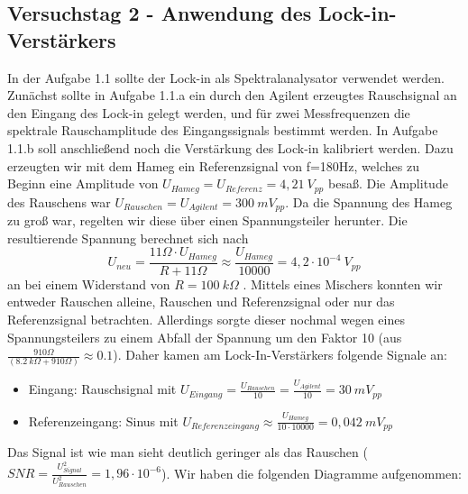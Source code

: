 \documentclass{scrartcl}						%
\begin{document}
		\subsection{Versuchstag 2 - Anwendung des Lock-in-Verstärkers}
			In der Aufgabe 1.1 sollte der Lock-in als Spektralanalysator verwendet werden.
			Zunächst sollte in Aufgabe 1.1.a ein durch den Agilent erzeugtes Rauschsignal an den Eingang des Lock-in gelegt werden, und für zwei Messfrequenzen die spektrale Rauschamplitude des Eingangssignals bestimmt werden. In Aufgabe 1.1.b soll anschließend noch die Verstärkung des Lock-in kalibriert werden. Dazu erzeugten wir mit dem Hameg ein Referenzsignal von f=180Hz, welches zu Beginn eine Amplitude von $ U_{Hameg}=U_{Referenz}=4,21 \ V_{pp} $ besaß. Die Amplitude des Rauschens war $ U_{Rauschen}=U_{Agilent}=300 \ mV_{pp} $. Da die Spannung des Hameg zu groß war, regelten wir diese über einen Spannungsteiler herunter. Die resultierende Spannung berechnet sich nach 
			\begin{equation*}
					U_{neu}=\frac{11\Omega \cdot U_{Hameg}}{R+11\Omega} \approx \frac{U_{Hameg}}{10000} =4,2\cdot 10^{-4} \ V_{pp} 
			\end{equation*}
			an bei einem Widerstand von $ R=100 \ k\Omega$ .
			Mittels eines Mischers konnten wir entweder Rauschen alleine, Rauschen und Referenzsignal oder nur das Referenzsignal betrachten. Allerdings sorgte dieser nochmal wegen eines Spannungsteilers zu einem Abfall der Spannung um den Faktor 10 (aus $ \frac{910 \Omega}{(8.2 \ k\Omega +910\Omega)} \approx 0.1$). Daher kamen am Lock-In-Verstärkers folgende Signale an:
			\begin{itemize}
			\item Eingang: Rauschsignal mit $ U_{Eingang}=\frac{U_{Rauschen}}{10}=\frac{U_{Agilent}}{10}=30 \ mV_{pp}$
			\item Referenzeingang: Sinus mit $ U_{Referenzeingang}\approx \frac{U_{Hameg}}{10 \cdot 10000 }= 0,042 \ mV_{pp}$
			\end{itemize} 
			Das Signal ist wie man sieht deutlich geringer als das Rauschen ($ SNR=\frac{U_{Signal}^2}{U_{Rauschen}^2}=1,96\cdot 10^{-6} $).\newline
			Wir haben die folgenden Diagramme aufgenommen:
\end{document}
